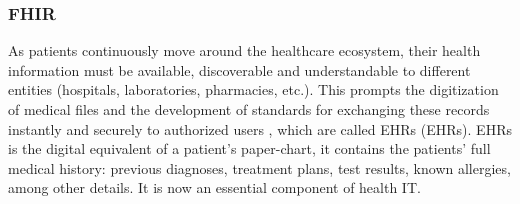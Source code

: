 
\subsubsection{\acf{FHIR}}

As patients continuously move around the healthcare ecosystem, their health information must be available, discoverable and understandable to different entities (hospitals, laboratories, pharmacies, etc.). This prompts the digitization of medical files and the development of standards for exchanging these records instantly and securely to authorized users \cite{HL72019}, which are called \acl{EHR}s (\acs{EHR}s). \acs{EHR}s is the digital equivalent of a patient's paper-chart, it contains the patients' full medical history: previous diagnoses, treatment plans, test results, known allergies, among other details. It is now an essential component of health IT. 

